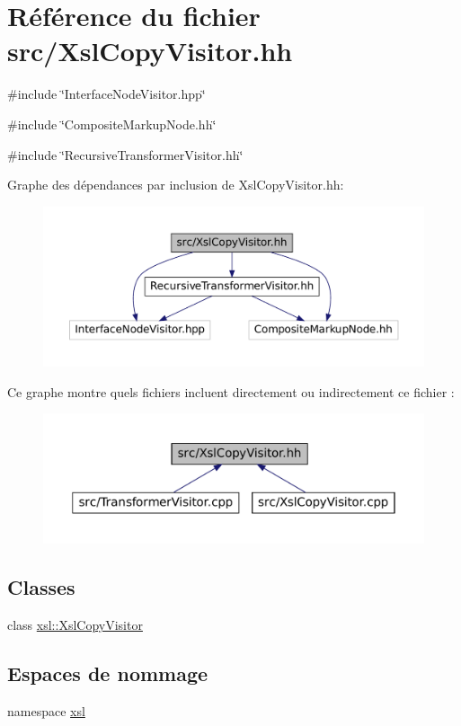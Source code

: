\hypertarget{_xsl_copy_visitor_8hh}{
\section{Référence du fichier src/XslCopyVisitor.hh}
\label{_xsl_copy_visitor_8hh}
}
{\ttfamily \#include \char`\"{}InterfaceNodeVisitor.hpp\char`\"{}}\par
{\ttfamily \#include \char`\"{}CompositeMarkupNode.hh\char`\"{}}\par
{\ttfamily \#include \char`\"{}RecursiveTransformerVisitor.hh\char`\"{}}\par
Graphe des dépendances par inclusion de XslCopyVisitor.hh:
\nopagebreak
\begin{figure}[H]
\begin{center}
\leavevmode
\includegraphics[width=400pt]{_xsl_copy_visitor_8hh__incl}
\end{center}
\end{figure}
Ce graphe montre quels fichiers incluent directement ou indirectement ce fichier :
\nopagebreak
\begin{figure}[H]
\begin{center}
\leavevmode
\includegraphics[width=400pt]{_xsl_copy_visitor_8hh__dep__incl}
\end{center}
\end{figure}
\subsection*{Classes}
\begin{DoxyCompactItemize}
\item 
class \hyperlink{classxsl_1_1_xsl_copy_visitor}{xsl::XslCopyVisitor}
\end{DoxyCompactItemize}
\subsection*{Espaces de nommage}
\begin{DoxyCompactItemize}
\item 
namespace \hyperlink{namespacexsl}{xsl}
\end{DoxyCompactItemize}
